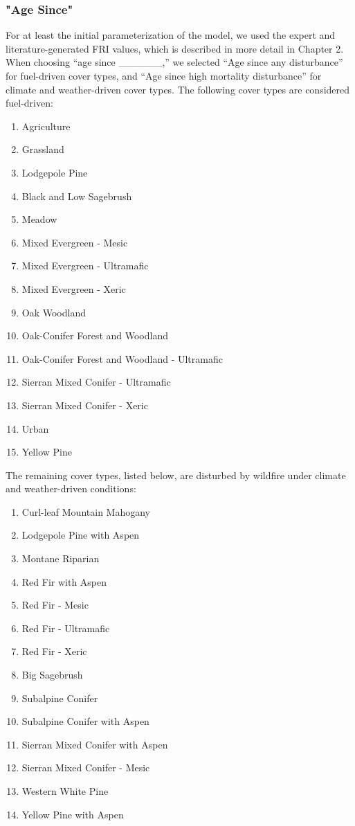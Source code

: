 \subsubsection{"Age Since"}
For at least the initial parameterization of the model, we used the expert and literature-generated FRI values, which is described in more detail in Chapter 2. When choosing ``age since \_\_\_\_\_\_,'' we selected ``Age since any disturbance'' for fuel-driven cover types, and ``Age since high mortality disturbance'' for climate and weather-driven cover types. The following cover types are considered fuel-driven:
\begin{enumerate}
    \item Agriculture
    \item Grassland
    \item Lodgepole Pine
    \item Black and Low Sagebrush
    \item Meadow
    \item Mixed Evergreen - Mesic
    \item Mixed Evergreen - Ultramafic
    \item Mixed Evergreen - Xeric
    \item Oak Woodland
    \item Oak-Conifer Forest and Woodland
    \item Oak-Conifer Forest and Woodland - Ultramafic
    \item Sierran Mixed Conifer - Ultramafic
    \item Sierran Mixed Conifer - Xeric
    \item Urban
    \item Yellow Pine
\end{enumerate}
The remaining cover types, listed below, are disturbed by wildfire under climate and weather-driven conditions:
\begin{enumerate}
    \item Curl-leaf Mountain Mahogany
    \item Lodgepole Pine with Aspen
    \item Montane Riparian
    \item Red Fir with Aspen
    \item Red Fir - Mesic
    \item Red Fir - Ultramafic
    \item Red Fir - Xeric
    \item Big Sagebrush
    \item Subalpine Conifer
    \item Subalpine Conifer with Aspen
    \item Sierran Mixed Conifer with Aspen
    \item Sierran Mixed Conifer - Mesic
    \item Western White Pine
    \item Yellow Pine with Aspen
\end{enumerate}

